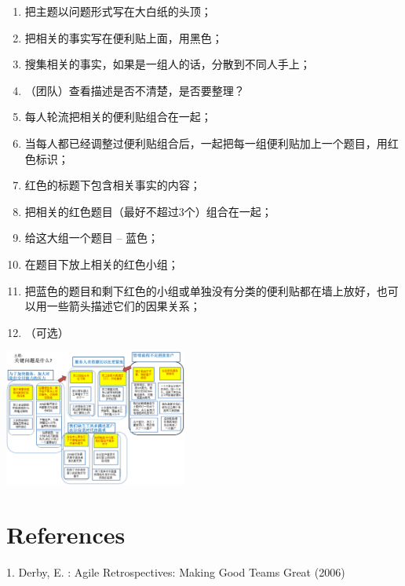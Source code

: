 \begin{enumerate}
\tightlist
\item
  把主题以问题形式写在大白纸的头顶；
\item
  把相关的事实写在便利贴上面，用黑色；
\item
  搜集相关的事实，如果是一组人的话，分散到不同人手上；
\item
  （团队）查看描述是否不清楚，是否要整理？
\item
  每人轮流把相关的便利贴组合在一起；
\item
  当每人都已经调整过便利贴组合后，一起把每一组便利贴加上一个题目，用红色标识；
\item
  红色的标题下包含相关事实的内容；
\item
  把相关的红色题目（最好不超过3个）组合在一起；
\item
  给这大组一个题目 -- 蓝色；
\item
  在题目下放上相关的红色小组；
\item
  把蓝色的题目和剩下红色的小组或单独没有分类的便利贴都在墙上放好，也可以用一些箭头描述它们的因果关系；
\item
  （可选）
\end{enumerate}

\begin{description}
\item[]
\end{description}


\includegraphics[width=6cm]{KJ_10.png}

\hypertarget{references}{%
\section{References}\label{references}}

1. Derby, E. : Agile Retrospectives: Making Good Teams Great (2006)





